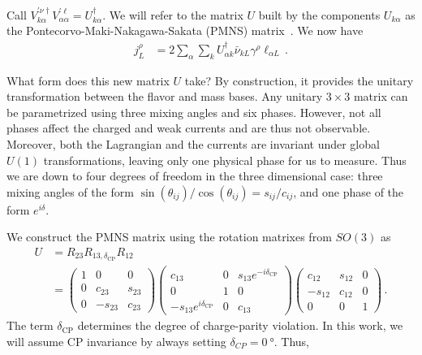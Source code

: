Call $V^{\prime \nu \dagger}_{k \alpha}V^{\prime \ell}_{\alpha \alpha} = U^\dagger_{k \alpha}$. We will refer to the matrix $U$ built by the components $U_{k \alpha}$ as the
Pontecorvo-Maki-Nakagawa-Sakata (PMNS) matrix~\cite{pontecorvo1957,maki1962}. %
We now have 
\begin{align}\label{eq:j_CC3} %
    j^\rho_L &= 2 \sum_\alpha \sum_k U^\dagger_{\alpha k} \bar{\nu}_{k L} \gamma^\rho  \ell_{\alpha L}\,.
\end{align}

What form does this new matrix $U$ take? By construction, it provides the unitary transformation between the flavor and mass bases.
Any unitary $3\times3$ matrix can be parametrized using three mixing angles and six phases. However, not all phases affect the 
charged and weak currents and are thus not observable. Moreover, both the Lagrangian and the currents are invariant under global $U(1)$ transformations,
leaving only one physical phase for us to measure. Thus we are down to four degrees of freedom in the three dimensional case: three mixing angles
of the form $\sin{(\theta_{ij})}/\cos{(\theta_{ij})} = s_{ij}/c_{ij}$, and one phase of the form $e^{i\delta}$.

We construct the PMNS matrix using the rotation matrixes from $SO(3)$ as
\begin{align}
    U &= R_{23}R_{13,\delta_{\text{CP}}}R_{12} \nonumber \\
      & = 
    \begin{pmatrix}1 & 0 & 0 \\ 0 & c_{23} & s_{23} \\ 0 & -s_{23} & c_{23}\end{pmatrix}
\begin{pmatrix}c_{13} & 0 & s_{13} e^{-i \delta_{\mathrm{CP}}} \\ 0 & 1 & 0 \\ -s_{13} e^{i \delta_{\mathrm{CP}}} & 0 & c_{13}\end{pmatrix}
\begin{pmatrix}c_{12} & s_{12} & 0 \\ -s_{12} & c_{12} & 0 \\ 0 & 0 & 1\end{pmatrix}\,.
\end{align}
The term $\delta_\text{CP}$ determines the degree of charge-parity violation. In this work, we will assume CP invariance by always
setting $\delta_{CP} = \SI{0}{\degree}$. Thus,

